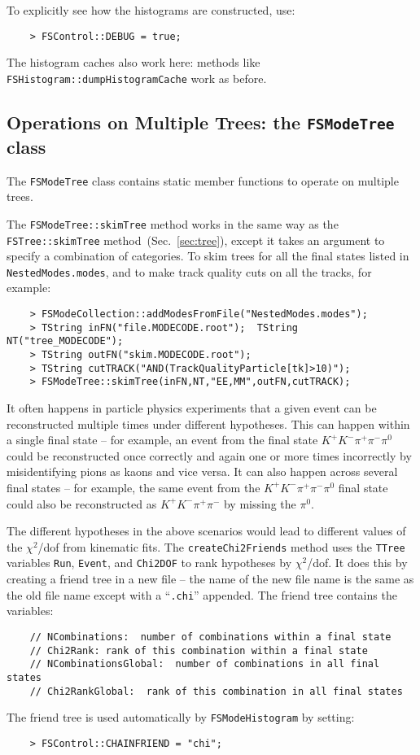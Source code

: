 \documentclass[11pt]{article}
\begin{document}
To explicitly see how the histograms are constructed, use:
\begin{verbatim}
    > FSControl::DEBUG = true;
\end{verbatim}

The histogram caches also work here:  methods like {\tt FSHistogram::dumpHistogramCache} work as before.


\subsection{Operations on Multiple Trees: the {\tt FSModeTree} class}
\label{sec:modetree}

The {\tt FSModeTree} class contains static member functions to operate on multiple trees.

The {\tt FSModeTree::skimTree} method works in the same way as the {\tt FSTree::skimTree} method~(Sec.~\ref{sec:tree}), except it takes an argument to specify a combination of categories.  To skim trees for all the final states listed in {\tt NestedModes.modes}, and to make track quality cuts on all the tracks, for example:
\begin{verbatim}
    > FSModeCollection::addModesFromFile("NestedModes.modes");
    > TString inFN("file.MODECODE.root");  TString NT("tree_MODECODE");
    > TString outFN("skim.MODECODE.root");
    > TString cutTRACK("AND(TrackQualityParticle[tk]>10)");
    > FSModeTree::skimTree(inFN,NT,"EE,MM",outFN,cutTRACK);
\end{verbatim}

It often happens in particle physics experiments that a given event can be reconstructed multiple times under different hypotheses.  This can happen within a single final state -- for example, an event from the final state $K^+K^-\pi^+\pi^-\pi^0$ could be reconstructed once correctly and again one or more times incorrectly by misidentifying pions as kaons and vice versa.  It can also happen across several final states -- for example, the same event from the $K^+K^-\pi^+\pi^-\pi^0$ final state could also be reconstructed as $K^+K^-\pi^+\pi^-$ by missing the $\pi^0$.  

The different hypotheses in the above scenarios would lead to different values of the $\chi^2$/dof from kinematic fits.  The {\tt createChi2Friends} method uses the {\tt TTree} variables {\tt Run}, {\tt Event}, and {\tt Chi2DOF} to rank hypotheses by $\chi^2$/dof.  It does this by creating a friend tree in a new file -- the name of the new file name is the same as the old file name except with a ``{\tt .chi}'' appended.  The friend tree contains the variables:
\begin{verbatim}
    // NCombinations:  number of combinations within a final state
    // Chi2Rank: rank of this combination within a final state
    // NCombinationsGlobal:  number of combinations in all final states
    // Chi2RankGlobal:  rank of this combination in all final states
\end{verbatim}
The friend tree is used automatically by {\tt FSModeHistogram} by setting:
\begin{verbatim}
    > FSControl::CHAINFRIEND = "chi";
\end{verbatim}
\end{document}
